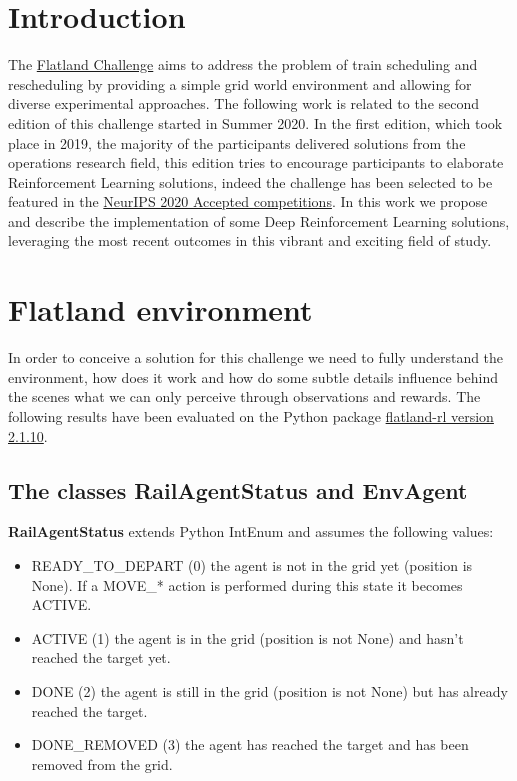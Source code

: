 \documentclass[11pt, a4paper, hidelinks]{report}
\begin{document}
\chapter{Introduction}

The \href{https://www.aicrowd.com/challenges/neurips-2020-flatland-challenge/}{Flatland Challenge} aims to address the problem of train scheduling and rescheduling by providing a simple grid world environment and allowing for diverse experimental approaches.
The following work is related to the second edition of this challenge started in Summer 2020.
In the first edition, which took place in 2019, the majority of the participants delivered solutions from the operations research field, this edition tries to encourage participants to elaborate Reinforcement Learning solutions, indeed the challenge has been selected to be featured in the \href{https://neurips.cc/Conferences/2020/CompetitionTrack}{NeurIPS 2020 Accepted competitions}.
In this work we propose and describe the implementation of some Deep Reinforcement Learning solutions, leveraging the most recent outcomes in this vibrant and exciting field of study.

\chapter{Flatland environment}\label{ch:flatland-environment}

In order to conceive a solution for this challenge we need to fully understand the environment, how does it work and how do some subtle details influence behind the scenes what we can only perceive through observations and rewards.
The following results have been evaluated on the Python package \href{https://pypi.org/project/flatland-rl/}{flatland-rl version 2.1.10}.

\section{The classes RailAgentStatus and EnvAgent}\label{sec:the-classes-railagentstatus-and-envagent}

\textbf{RailAgentStatus} extends Python IntEnum and assumes the following values:
\begin{itemize}
	\item READY\_TO\_DEPART (0) the agent is not in the grid yet (position is None).
If a MOVE\_* action is performed during this state it becomes ACTIVE\@.
	\item ACTIVE (1) the agent is in the grid (position is not None) and hasn't reached the target yet.
	\item DONE (2) the agent is still in the grid (position is not None) but has already reached the target.
	\item DONE\_REMOVED (3) the agent has reached the target and has been removed from the grid.
\end{itemize}
\end{document}
